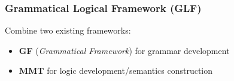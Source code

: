 \documentclass{beamer}
\newcommand{\com}[1]{\strut\hfil\strut\null\nobreak\hfill\hbox{{\itshape \color{black!50}#1}}\par}
\begin{document}
% 

\begin{frame}[fragile]
    \frametitle{Grammatical Logical Framework (GLF)}

        Combine two existing frameworks:
        \begin{itemize}
            \item \textbf{GF} (\emph{Grammatical Framework}) for grammar development
            \item \textbf{MMT} for logic development/semantics construction
        \end{itemize}

    \vspace{1em}
        
\end{frame}
\end{document}
